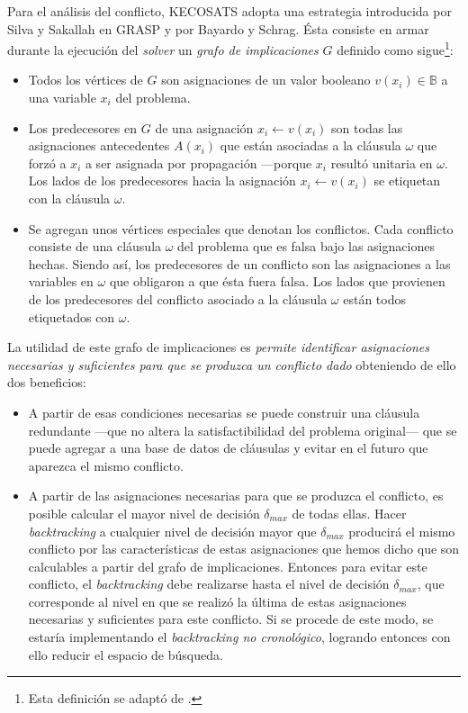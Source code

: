 \documentclass[12pt,lettersize,oneside]{article}
\begin{document}
Para el análisis del conflicto, KECOSATS adopta una estrategia introducida por
Silva y Sakallah en GRASP y por Bayardo y Schrag. \'Esta consiste en armar
durante la ejecución del \emph{solver} un \emph{grafo de implicaciones} $G$
definido como sigue\footnote{Esta definición se adaptó de \cite{grasp96}.}:
\begin{itemize}\vspace{-2.5mm}
\item Todos los vértices de $G$ son asignaciones de un valor booleano $v(x_i)
  \in \mathbb{B}$ a una variable $x_i$ del problema.
\item Los predecesores en $G$ de una asignación $x_i \gets v(x_i)$ son todas las
  asignaciones antecedentes $A(x_i)$ que están asociadas a la cláusula $\omega$
  que forzó a $x_i$ a ser asignada por propagación ---porque $x_i$ resultó
  unitaria en $\omega$. Los lados de los predecesores hacia la asignación $x_i
  \gets v(x_i)$ se etiquetan con la cláusula $\omega$.
\item Se agregan unos vértices especiales que denotan los conflictos. Cada
  conflicto consiste de una cláusula $\omega$ del problema que es falsa bajo las
  asignaciones hechas. Siendo así, los predecesores de un conflicto son las
  asignaciones a las variables en $\omega$ que obligaron a que ésta fuera
  falsa. Los lados que provienen de los predecesores del conflicto asociado a la
  cláusula $\omega$ están todos etiquetados con $\omega$.
\end{itemize}\vspace{-2.5mm}

La utilidad de este grafo de implicaciones es \emph{permite identificar
  asignaciones necesarias y suficientes para que se produzca un conflicto dado}
obteniendo de ello dos beneficios:
\begin{itemize}
\item A partir de esas condiciones necesarias se puede construir una cláusula
  redundante ---que no altera la satisfactibilidad del problema original--- que
  se puede agregar a una base de datos de cláusulas y evitar en el futuro que
  aparezca el mismo conflicto.
\item A partir de las asignaciones necesarias para que se produzca el conflicto,
  es posible calcular el mayor nivel de decisión $\delta_{max}$ de todas
  ellas. Hacer \emph{backtracking} a cualquier nivel de decisión mayor que
  $\delta_{max}$ producirá el mismo conflicto por las características de estas
  asignaciones que hemos dicho que son calculables a partir del grafo de
  implicaciones. Entonces para evitar este conflicto, el \emph{backtracking}
  debe realizarse hasta el nivel de decisión $\delta_{max}$, que corresponde al
  nivel en que se realizó la última de estas asignaciones necesarias y
  suficientes para este conflicto. Si se procede de este modo, se estaría
  implementando el \emph{backtracking no cronológico}, logrando entonces con
  ello reducir el espacio de búsqueda.
\end{itemize}
\end{document}
